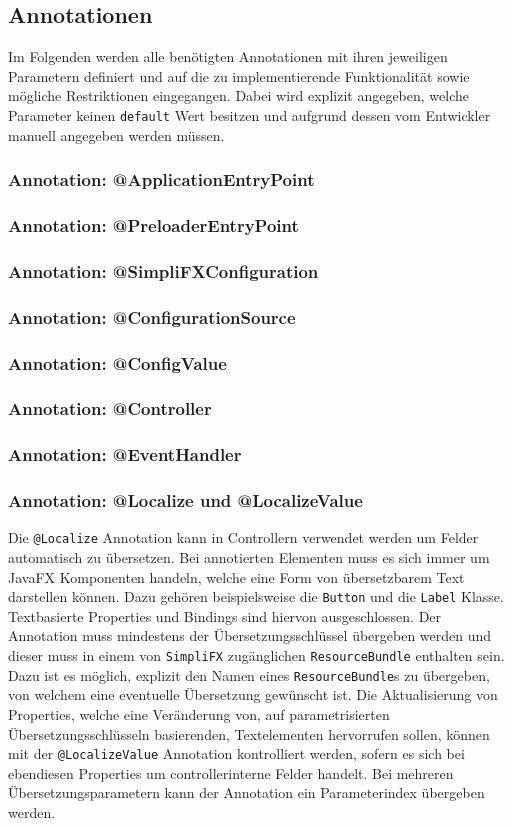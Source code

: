 \subsection{Annotationen}
Im Folgenden werden alle benötigten Annotationen mit ihren jeweiligen Parametern definiert und auf die zu implementierende Funktionalität sowie mögliche Restriktionen eingegangen. Dabei wird explizit angegeben, welche Parameter keinen \texttt{default} Wert besitzen und aufgrund dessen vom Entwickler manuell angegeben werden müssen.
\subsubsection{Annotation: @ApplicationEntryPoint}
\subsubsection{Annotation: @PreloaderEntryPoint}
\subsubsection{Annotation: @SimpliFXConfiguration}
\subsubsection{Annotation: @ConfigurationSource}
\subsubsection{Annotation: @ConfigValue}
\subsubsection{Annotation: @Controller}
\subsubsection{Annotation: @EventHandler}
\subsubsection{Annotation: @Localize und @LocalizeValue}
Die \texttt{@Localize} Annotation kann in Controllern verwendet werden um Felder automatisch zu übersetzen. Bei annotierten Elementen muss es sich immer um JavaFX Komponenten handeln, welche eine Form von übersetzbarem Text darstellen können. Dazu gehören beispielsweise die \texttt{Button} und die \texttt{Label} Klasse. Textbasierte Properties und Bindings sind hiervon ausgeschlossen. Der Annotation muss mindestens der Übersetzungsschlüssel übergeben werden und dieser muss in einem von \texttt{SimpliFX} zugänglichen \texttt{ResourceBundle} enthalten sein. Dazu ist es möglich, explizit den Namen eines \texttt{ResourceBundle}s zu übergeben, von welchem eine eventuelle Übersetzung gewünscht ist. Die Aktualisierung von Properties, welche eine Veränderung von, auf parametrisierten Übersetzungsschlüsseln basierenden, Textelementen hervorrufen sollen, können mit der \texttt{@LocalizeValue} Annotation kontrolliert werden, sofern es sich bei ebendiesen Properties um controllerinterne Felder handelt. Bei mehreren Übersetzungsparametern kann der Annotation ein Parameterindex übergeben werden.
